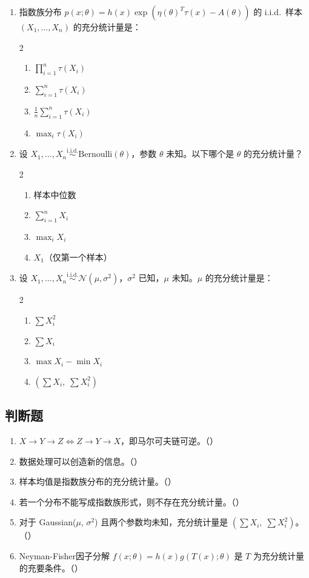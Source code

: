 \documentclass[12pt,a4paper]{ctexart}
\newcommand{\iid}{\overset{\text{i.i.d.}}{\sim}}
\begin{document}
\begin{enumerate}[label=\arabic*., leftmargin=*]
\item 指数族分布 $p(x;\theta) = h(x)\exp(\eta(\theta)^T\tau(x) - A(\theta))$ 的 i.i.d.\ 样本 $(X_1,\ldots,X_n)$ 的充分统计量是：
\begin{multicols}{2}
\begin{enumerate}[label=(\Alph*)]
  \item $\prod_{i=1}^{n} \tau(X_i)$
  \item $\sum_{i=1}^{n} \tau(X_i)$
  \item $\frac{1}{n}\sum_{i=1}^{n} \tau(X_i)$
  \item $\max_i \tau(X_i)$
\end{enumerate}
\end{multicols}

\item 设 $X_1,\ldots,X_n \iid \mathrm{Bernoulli}(\theta)$，参数 $\theta$ 未知。以下哪个是 $\theta$ 的充分统计量？
\begin{multicols}{2}
\begin{enumerate}[label=(\Alph*)]
  \item 样本中位数
  \item $\sum_{i=1}^{n} X_i$
  \item $\max_i X_i$
  \item $X_1$（仅第一个样本）
\end{enumerate}
\end{multicols}

\item 设 $X_1,\ldots,X_n \iid \mathcal{N}(\mu, \sigma^2)$，$\sigma^2$ 已知，$\mu$ 未知。$\mu$ 的充分统计量是：
\begin{multicols}{2}
\begin{enumerate}[label=(\Alph*)]
  \item $\sum X_i^2$
  \item $\sum X_i$
  \item $\max X_i - \min X_i$
  \item $(\sum X_i,\; \sum X_i^2)$
\end{enumerate}
\end{multicols}

\end{enumerate}

\subsection*{判断题}

\begin{enumerate}[label=\arabic*., leftmargin=*]
\item $X \to Y \to Z \iff Z \to Y \to X$，即马尔可夫链可逆。（\quad）
\item 数据处理可以创造新的信息。（\quad）
\item 样本均值是指数族分布的充分统计量。（\quad）
\item 若一个分布不能写成指数族形式，则不存在充分统计量。（\quad）
\item 对于 Gaussian($\mu$, $\sigma^2$) 且两个参数均未知，充分统计量是 $(\sum X_i,\; \sum X_i^2)$。（\quad）
\item Neyman-Fisher因子分解 $f(x;\theta)=h(x)g(T(x);\theta)$ 是 $T$ 为充分统计量的充要条件。（\quad）
\end{enumerate}
\end{document}
